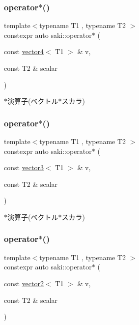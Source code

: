 \subsubsection{\texorpdfstring{operator$\ast$()}{operator*()}\hspace{0.1cm}{\footnotesize\ttfamily [2/14]}}
{\footnotesize\ttfamily template$<$typename T1 , typename T2 $>$ \\
constexpr auto saki\+::operator$\ast$ (\begin{DoxyParamCaption}\item[{const \mbox{\hyperlink{classsaki_1_1vector4}{vector4}}$<$ T1 $>$ \&}]{v,  }\item[{const T2 \&}]{scalar }\end{DoxyParamCaption})}



$\ast$演算子(ベクトル$\ast$スカラ) 

\mbox{\label{namespacesaki_abd9716c5a5ccdc1cafb975df8897acb3}} 
\subsubsection{\texorpdfstring{operator$\ast$()}{operator*()}\hspace{0.1cm}{\footnotesize\ttfamily [3/14]}}
{\footnotesize\ttfamily template$<$typename T1 , typename T2 $>$ \\
constexpr auto saki\+::operator$\ast$ (\begin{DoxyParamCaption}\item[{const \mbox{\hyperlink{classsaki_1_1vector3}{vector3}}$<$ T1 $>$ \&}]{v,  }\item[{const T2 \&}]{scalar }\end{DoxyParamCaption})}



$\ast$演算子(ベクトル$\ast$スカラ) 

\mbox{\label{namespacesaki_af6d6668922b972ec01303867612e4783}} 
\subsubsection{\texorpdfstring{operator$\ast$()}{operator*()}\hspace{0.1cm}{\footnotesize\ttfamily [4/14]}}
{\footnotesize\ttfamily template$<$typename T1 , typename T2 $>$ \\
constexpr auto saki\+::operator$\ast$ (\begin{DoxyParamCaption}\item[{const \mbox{\hyperlink{classsaki_1_1vector2}{vector2}}$<$ T1 $>$ \&}]{v,  }\item[{const T2 \&}]{scalar }\end{DoxyParamCaption})}



